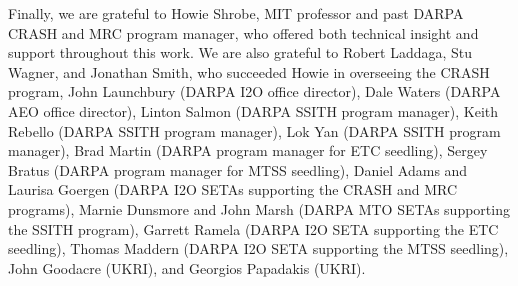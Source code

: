 \noindent
Finally, we are grateful to Howie Shrobe, MIT professor and past DARPA CRASH
and MRC program manager, who offered both technical insight and support
throughout this work.
We are also grateful to Robert Laddaga, Stu Wagner, and Jonathan Smith,
who succeeded Howie in overseeing the CRASH program,
John Launchbury (DARPA I2O office director),
Dale Waters (DARPA AEO office director),
Linton Salmon (DARPA SSITH program manager),
Keith Rebello (DARPA SSITH program manager),
Lok Yan (DARPA SSITH program manager),
Brad Martin (DARPA program manager for ETC seedling),
Sergey Bratus (DARPA program manager for MTSS seedling),
Daniel Adams and Laurisa Goergen (DARPA I2O SETAs supporting the CRASH and MRC programs),
Marnie Dunsmore and John Marsh (DARPA MTO SETAs supporting the SSITH program),
Garrett Ramela (DARPA I2O SETA supporting the ETC seedling),
Thomas Maddern (DARPA I2O SETA supporting the MTSS seedling),
John Goodacre (UKRI), and Georgios Papadakis (UKRI).
